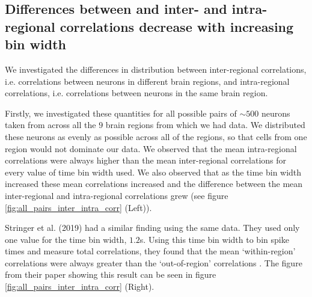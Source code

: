   \subsection{Differences between and inter- and intra- regional correlations decrease with increasing bin width}
  We investigated the differences in distribution between inter-regional correlations, i.e. correlations between neurons in different brain regions, and intra-regional correlations, i.e. correlations between neurons in the same brain region.

  Firstly, we investigated these quantities for all possible pairs of $\sim 500$ neurons taken from across all the $9$ brain regions from which we had data. We distributed these neurons as evenly as possible across all of the regions, so that cells from one region would not dominate our data. We observed that the mean intra-regional correlations were always higher than the mean inter-regional correlations for every value of time bin width used. We also observed that as the time bin width increased these mean correlations increased and the difference between the mean inter-regional and intra-regional correlations grew (see figure \ref{fig:all_pairs_inter_intra_corr} (Left)).

  Stringer et al. (2019) had a similar finding using the same data. They used only one value for the time bin width, $1.2$s. Using this time bin width to bin spike times and measure total correlations, they found that the mean `within-region' correlations were always greater than the `out-of-region' correlations  \parencite{stringer}. The figure from their paper showing this result can be seen in figure \ref{fig:all_pairs_inter_intra_corr} (Right).

